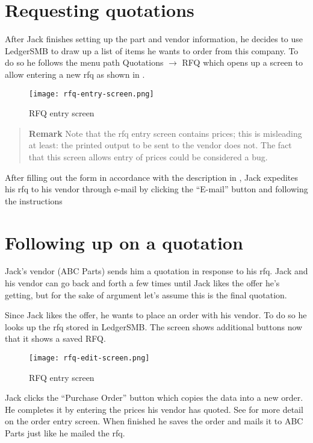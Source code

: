 \section{Requesting quotations}

After Jack finishes setting up the part and vendor information, he decides to use LedgerSMB to draw
up a list of items he wants to order from this company. To do so he follows the menu path
Quotations $\rightarrow$ RFQ which opens up a screen to allow entering a new \gls{rfq} as shown
in .

\begin{figure}[h]
\centering
\texttt{[image: rfq-entry-screen.png]}
\caption{RFQ entry screen}
\label{fig:bus-rfq-entry-screen}
\end{figure}

\begin{quotation}
\textbf{Remark} Note that the \gls{rfq} entry screen contains prices; this is misleading
at least: the printed output to be sent to the vendor does not. The fact that this screen
allows entry of prices could be considered a bug.
\end{quotation}

After filling out the form in accordance with the description in ,
Jack expedites his \gls{rfq} to his vendor through e-mail by clicking the ``E-mail'' button and
following the instructions 

\section{Following up on a quotation}

Jack's vendor (ABC Parts) sends him a quotation in response to his \gls{rfq}. Jack and his vendor
can go back and forth a few times until Jack likes the offer he's getting, but for the sake of
argument let's assume this is the final quotation.

Since Jack likes the offer, he wants to place an order with his vendor. To do so he looks up the
\gls{rfq} stored in LedgerSMB. The screen shows additional buttons now that it shows a saved RFQ.


\begin{figure}[h]
\centering
\texttt{[image: rfq-edit-screen.png]}
\caption{RFQ entry screen}
\label{fig:bus-rfq-edit-screen}
\end{figure}

Jack clicks the ``Purchase Order'' button which copies the data into a new order. He completes it
by entering the prices his vendor has quoted. See  for more
detail on the order entry screen. When finished he saves the order and mails it to
ABC Parts just like he mailed the \gls{rfq}.

